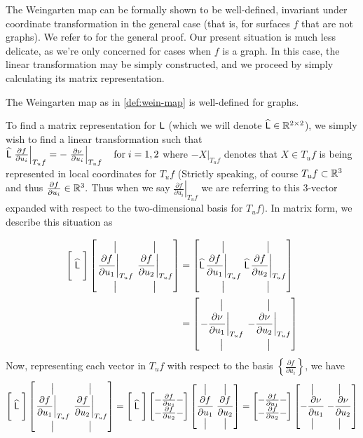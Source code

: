 	The Weingarten map can be formally shown to be well-defined, invariant under coordinate transformation in the general case (that is, for surfaces $f$ that are not graphs). We refer to \cite{Kuhnel-DiffGeo} for the general proof. Our present situation is much less delicate, as we're only concerned for cases when $f$ is a graph. In this case, the linear transformation may be simply constructed, and we proceed by simply calculating its matrix representation.	
	\begin{lemma}
		The Weingarten map as in \cref{def:wein-map} is well-defined for graphs.
	\end{lemma}
	To find a matrix representation for $\mathsf{L}$ (which we will denote $\widehat{\mathsf{L}} \in \mathbb{R}^{2\times2}$), we simply wish to find a linear transformation
	such that
	$\widehat{\mathsf{L}} \left.\frac{\partial f}{\partial u_i}\right|_{T_u f}
		= - \left.\frac{\partial \nu}{\partial u_i}\right|_{T_u f} \quad \textrm{for} \; i=1,2$
			where $- \left.X\right|_{T_u f}$ denotes that $X \in T_u f$ is being represented in 
	local coordinates for $T_u f$ (Strictly speaking, of course $T_u f \subset \mathbb{R}^3$ and thus
	$\frac{\partial f}{\partial u_i} \in \mathbb{R}^3.$ Thus when we say $ \left.\frac{\partial f}{\partial u_i}\right|_{T_u f}$ we are referring to this 3-vector expanded with respect to the two-dimensional basis for $T_u f$). In matrix form, we describe this situation as
	
	\begin{align}
	\Bigg[ \;\widehat{\mathsf{L}}\; \Bigg]
	\left[ \overset{\big\vert}{\underset{\big\vert}{\left.\frac{\partial f}{\partial u_1}\right|_{T_u f}}} \;
			\overset{\big\vert}{\underset{\big\vert}{\left.\frac{\partial f}{\partial u_2}\right|_{T_u f}}} \right]
			&= \left[ \widehat{\mathsf{L}} \overset{\big\vert}{\underset{\big\vert}{\left.\frac{\partial f}{\partial u_1}\right|_{T_u f}}} \;
			\widehat{\mathsf{L}} \overset{\big\vert}{\underset{\big\vert}{\left.\frac{\partial f}{\partial u_2}\right|_{T_u f}}} \right] \\
			&= \left[ \overset{\big\vert}{\underset{\big\vert}{ \left.-\frac{\partial \nu}{\partial u_1}\right|_{T_u f}}} \;
			\overset{\big\vert}{\underset{\big\vert}{\left.-\frac{\partial \nu}{\partial u_2}\right|_{T_u f}}} \right]
			\end{align}
			Now, representing each vector in  $T_u f$ with respect to the basis $\left\{ \frac{\partial f}{\partial u_i}\right\}$, we have
  \begin{align}
      	\Bigg[ \;\widehat{\mathsf{L}}\; \Bigg]
      \left[ \overset{\big\vert}{\underset{\big\vert}{\left.\frac{\partial f}{\partial u_1}\right|_{T_u f}}} \;
      \overset{\big\vert}{\underset{\big\vert}{\left.\frac{\partial f}{\partial u_2}\right|_{T_u f}}} \right]
      = 
			\Bigg[ \;\widehat{\mathsf{L}}\; \Bigg]
			\begin{bmatrix} - \frac{\partial f}{\partial u_1} - \\
				- \frac{\partial f}{\partial u_2} -
							\end{bmatrix}
			\left[ \overset{\big\vert}{\underset{\big\vert}{\frac{\partial f}{\partial u_1}}} \;
				\overset{\big\vert}{\underset{\big\vert}{\frac{\partial f}{\partial u_2}}}\right]
				= \begin{bmatrix} - \frac{\partial f}{\partial u_1} - \\
				- \frac{\partial f}{\partial u_2} -
				\end{bmatrix}
				\left[ \overset{\big\vert}{\underset{\big\vert}{-\frac{\partial \nu}{\partial u_1}}} \;
				\overset{\big\vert}{\underset{\big\vert}{-\frac{\partial \nu}{\partial u_2}}}\right] \\
	\end{align}
		 
